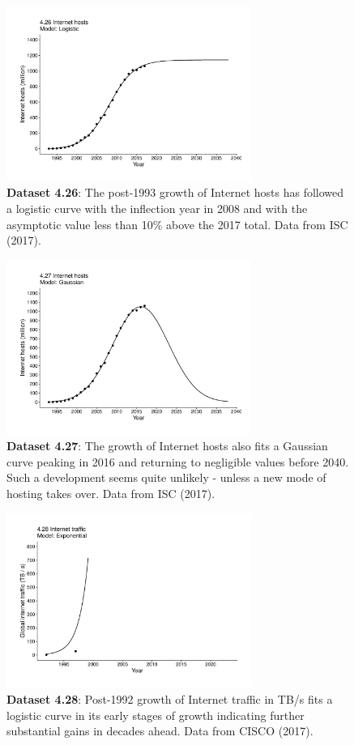 \documentclass[aps,rmp,preprint,superscriptaddress,10pt,onecolumn]{article}
\begin{document}
\begin{figure}[h]
\includegraphics[width=8cm]{output/figs-ggplot/4.26.pdf}
\caption{\textbf{Dataset 4.26}: The post-1993 growth of Internet hosts has followed a logistic curve with the inflection year in 2008 and with the asymptotic value less than 10\% above the 2017 total. Data from ISC (2017). }
\end{figure}
	
\begin{figure}[h]
\includegraphics[width=8cm]{output/figs-ggplot/4.27.pdf}
\caption{\textbf{Dataset 4.27}: The growth of Internet hosts also fits a Gaussian curve peaking in 2016 and returning to negligible values before 2040. Such a development seems quite unlikely - unless a new mode of hosting takes over. Data from ISC (2017).}
\end{figure}
	
\begin{figure}[h]
\includegraphics[width=8cm]{output/figs-ggplot/4.28.pdf}
\caption{\textbf{Dataset 4.28}: Post-1992 growth of Internet traffic in TB/s fits a logistic curve in its early stages of growth indicating further substantial gains in decades ahead. Data from CISCO (2017).}
\end{figure}
	
\end{document}

